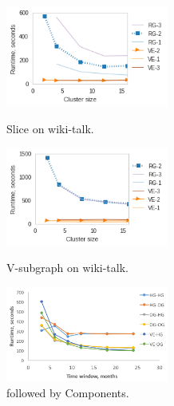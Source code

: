 \begin{figure}[t]
\vspace{-0.2in}
\centering
\begin{minipage}{2.2in}
\centering
\includegraphics[width=2.1in]{figs/slice_wikitalk_scale_build13.png}
\caption{Slice on wiki-talk.}
\label{fig:slicescale}
\vspace{-0.1in}
\end{minipage}
\begin{minipage}{2.2in}
\centering
\includegraphics[width=2.1in]{figs/select_wikitalk_scale_build13.png}
\caption{V-subgraph on wiki-talk.}
\label{fig:selectscale}
\vspace{-0.1in}
\end{minipage}
\begin{minipage}{2.2in}
\centering
\includegraphics[width=2.1in]{figs/switch_cc.png}
\caption{ followed by Components.}
\label{fig:ncrtocc}
\vspace{-0.1in}
\end{minipage}
\end{figure}

